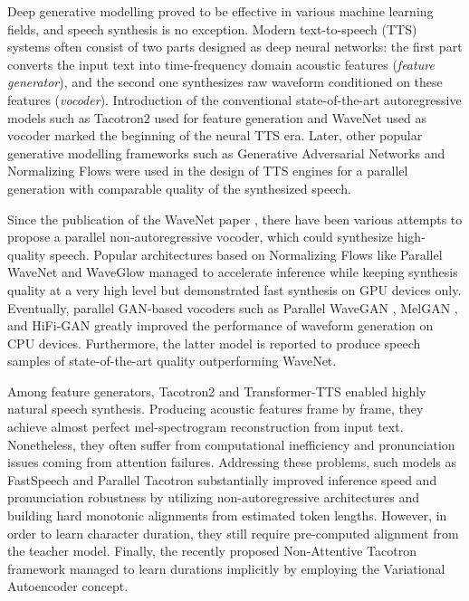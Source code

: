 \documentclass{article}
\begin{document}
Deep generative modelling proved to be effective in various machine learning fields, and speech synthesis is no exception. Modern text-to-speech (TTS) systems often consist of two parts designed as deep neural networks: the first part converts the input text into time-frequency domain acoustic features (\textit{feature generator}), and the second one synthesizes raw waveform conditioned on these features (\textit{vocoder}). Introduction of the conventional state-of-the-art autoregressive models such as Tacotron2 \cite{Tacotron2} used for feature generation and WaveNet \cite{WaveNet} used as vocoder marked the beginning of the neural TTS era. Later, other popular generative modelling frameworks such as Generative Adversarial Networks \cite{GANPaper} and Normalizing Flows \cite{NFlows} were used in the design of TTS engines for a parallel generation with comparable quality of the synthesized speech. 


Since the publication of the WaveNet paper , there have been various attempts to propose a parallel non-autoregressive vocoder, which could synthesize high-quality speech. Popular architectures based on Normalizing Flows like Parallel WaveNet \cite{ParallelWaveNet} and WaveGlow \cite{WaveGlow} managed to accelerate inference while keeping synthesis quality at a very high level but demonstrated fast synthesis on GPU devices only. Eventually, parallel GAN-based vocoders such as Parallel WaveGAN \cite{ParallelWaveGAN}, MelGAN \cite{MelGan}, and HiFi-GAN \cite{HiFi-GAN} greatly improved the performance of waveform generation on CPU devices. Furthermore, the latter model is reported to produce speech samples of state-of-the-art quality outperforming WaveNet.

Among feature generators, Tacotron2 \cite{Tacotron2} and Transformer-TTS \cite{TransformerTTS} enabled highly natural speech synthesis. Producing acoustic features frame by frame, they achieve almost perfect mel-spectrogram reconstruction from input text. Nonetheless, 
they often suffer from computational inefficiency and pronunciation issues coming from attention failures.
Addressing these problems, such models as FastSpeech \cite{FastSpeech} and Parallel Tacotron \cite{ParallelTacotron} substantially improved inference speed and pronunciation robustness by utilizing non-autoregressive architectures and building hard monotonic alignments from estimated token lengths. However, in order to learn character duration, they still require pre-computed alignment from the teacher model. Finally, the recently proposed Non-Attentive Tacotron framework \cite{NonAttentiveTacotron} managed to learn durations implicitly by employing the Variational Autoencoder concept.
\end{document}
